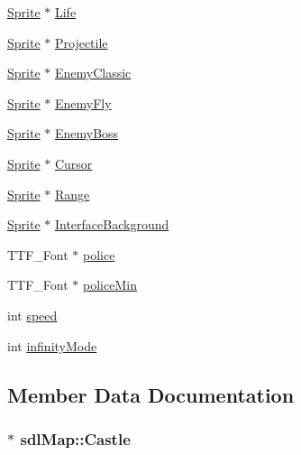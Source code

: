 \begin{DoxyCompactItemize}
\item 
\hyperlink{struct_sprite}{Sprite} $\ast$ \hyperlink{structsdl_map_aa53b862554a932ba9344ec8c92483bca}{Life}
\item 
\hyperlink{struct_sprite}{Sprite} $\ast$ \hyperlink{structsdl_map_a6548a3f2c7badec102f4f1c8e735d476}{Projectile}
\item 
\hyperlink{struct_sprite}{Sprite} $\ast$ \hyperlink{structsdl_map_a5dc535d0f63b57bbcc90a0b97ba78717}{Enemy\+Classic}
\item 
\hyperlink{struct_sprite}{Sprite} $\ast$ \hyperlink{structsdl_map_a894d4ebdb480c9e9fe57ad0cf0ed02f2}{Enemy\+Fly}
\item 
\hyperlink{struct_sprite}{Sprite} $\ast$ \hyperlink{structsdl_map_ac1a797b044af2a0f43862dc77973a668}{Enemy\+Boss}
\item 
\hyperlink{struct_sprite}{Sprite} $\ast$ \hyperlink{structsdl_map_a236dd04a2df7f7f7206f8021efef2569}{Cursor}
\item 
\hyperlink{struct_sprite}{Sprite} $\ast$ \hyperlink{structsdl_map_a8c80e7ab9d667f3fed257e740c127754}{Range}
\item 
\hyperlink{struct_sprite}{Sprite} $\ast$ \hyperlink{structsdl_map_aa1020fa93135fd48a6621598ae62be64}{Interface\+Background}
\item 
T\+T\+F\+\_\+\+Font $\ast$ \hyperlink{structsdl_map_a79fc8a90bb1543b634696c4ecc724fff}{police}
\item 
T\+T\+F\+\_\+\+Font $\ast$ \hyperlink{structsdl_map_aa40797238dd8d6307fff78b65c2c1d54}{police\+Min}
\item 
int \hyperlink{structsdl_map_a16d791a447f9fcc7d5a194aba72a4798}{speed}
\item 
int \hyperlink{structsdl_map_a2951a38d01edee04c9137f321e237728}{infinity\+Mode}
\end{DoxyCompactItemize}


\subsection{Member Data Documentation}
\hypertarget{structsdl_map_a158977a54df1d156983f52481a657cb8}{}
\subsubsection[{Castle}]{$\ast$ sdl\+Map\+::\+Castle}\label{structsdl_map_a158977a54df1d156983f52481a657cb8}
\hypertarget{structsdl_map_a236dd04a2df7f7f7206f8021efef2569}{}
